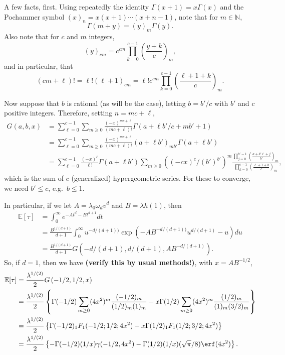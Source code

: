 \documentclass{article}
\newcommand{\E}{\mathbb{E}}
\newcommand{\N}{\mathbb{N}}
\begin{document}
A few facts, first.
Using repeatedly the identity $\Gamma(x+1) = x\Gamma(x)$
and the Pochammer symbol $(x)_n = x(x+1)\cdots(x+n-1)$,
note that for $m \in \N$,
\[
    \Gamma(m+y) = (y)_m \Gamma(y).
\]
Also note that for $c$ and $m$ integers,
\[
    (y)_{cm} = c^{cm} \prod_{k=0}^{c-1} (\frac{y+k}{c})_{m} ,
\]
and in particular, that
\[
    (cm+\ell)! = \ell! (\ell+1)_{cm} = \ell! c^{cm} \prod_{k=0}^{c-1} (\frac{\ell+1+k}{c})_m .
\]

Now suppose that $b$ is rational (as will be the case), letting $b = b'/c$ with $b'$ and $c$ positive integers.
Therefore, setting $n = mc+\ell$,
\begin{align}
    G(a,b,x) &= \sum_{\ell=0}^{c-1} \sum_{m \ge 0} \frac{(-x)^{mc+\ell}}{(mc+\ell)!} \Gamma(a+\ell b'/c+mb'+1) \\
            &= \sum_{\ell=0}^{c-1} \sum_{m \ge 0} \frac{(-x)^{mc+\ell}}{(mc+\ell)!} (a+\ell b')_{mb'} \Gamma(a + \ell b') \\
            &= \sum_{\ell=0}^{c-1} \frac{ (-x)^{\ell} }{ \ell! } \Gamma(a + \ell b') \sum_{m \ge 0} ( (-cx)^c / (b')^{b'} )^m 
                    \frac{ \prod_{j=0}^{b'-1} (\frac{ a+b'\ell+j }{ b' } )_m }{ \prod_{k=0}^{c-1} (\frac{\ell+1+k}{c})_m } ,
\end{align}
which is the sum of $c$ (generalized) hypergeometric series.
For these to converge, we need $b' \le c$, e.g.\ $b\le 1$.

In particular, if we let $A=\lambda_0 \omega_d v^d $ and $B=\lambda h(1)$, then 
\begin{align}
    \E[\tau] &= \int_0^\infty e^{-A t^d - B t^{d+1}} dt \\
            &= \frac{B^{1/(d+1)}}{d+1} \int_0^\infty u^{-d/(d+1))} \exp\left( -AB^{-d/(d+1))} u^{d/(d+1)} -u \right) du \\
            &= \frac{B^{1/(d+1)}}{d+1} G \left(-d/(d+1), d/(d+1), A B^{-d/(d+1)} \right) .
\end{align}
So, if $d=1$, then we have {\bf (verify this by usual methods!)}, with $x = AB^{-1/2}$,
\begin{align}
    \E[\tau] &= \frac{\lambda^{1/(2)}}{2} G \left( -1/2, 1/2, x \right) \\
            &= \frac{\lambda^{1/(2)}}{2} \left\{ \Gamma(-1/2) \sum_{m\ge0} (4x^2)^m \frac{ (-1/2)_m }{ (1/2)_m (1)_m } 
                        - x \Gamma(1/2) \sum_{m\ge0} (4x^2)^m \frac{ (1/2)_m }{ (1)_m (3/2)_m }  \right\} \\
            &=  \frac{\lambda^{1/(2)}}{2} \left\{ \Gamma(-1/2) {}_1F_1(-1/2;1/2;4x^2) - x \Gamma(1/2) {}_1F_1(1/2;3/2;4x^2) \right\} \\
            &= \frac{\lambda^{1/(2)}}{2} \left\{ - \Gamma(-1/2) (1/x) \gamma(-1/2,4x^2) - \Gamma(1/2) (1/x) (\sqrt{\pi}/8) \erf(4x^2) \right\} .
\end{align}
\end{document}
